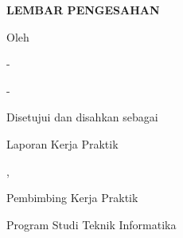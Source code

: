 \begin{titlepage}
\begin{center}
\vspace*{0cm}
{\bfseries\Large LEMBAR PENGESAHAN\par}
\vspace{0.5cm}
{\bfseries\Large \JudulLaporan\par
\bfseries\Large \TempatKP\par}
\vspace{1.5cm}
{Oleh\par
\Large \NamaMahasiswa- \NIM\par
\Large \NamaMahasiswaDua- \NIMDua\par}
\vfill
{Disetujui dan disahkan sebagai\par
Laporan Kerja Praktik\par}
\vspace{1.2cm}
{\Kota, \TanggalPengesahan\par}
\vspace{0.6cm}
{Pembimbing Kerja Praktik\par
Program Studi Teknik Informatika\par}
\vspace{1.5cm}
{\underline{\NamaDosenPembimbing}\par
\underline{\NIPDosenPembimbing}\par}
\end{center}
\end{titlepage}
